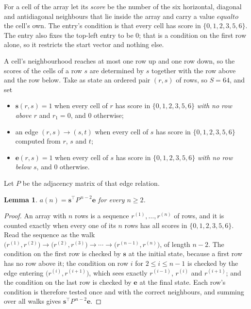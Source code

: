 \documentclass[11pt,a4paper]{article}
\theoremstyle{plain}
\newtheorem{lemma}[theorem]{Lemma}
\theoremstyle{definition}
\begin{document}
For a cell of the array let its \emph{score} be the number of the six horizontal, diagonal and antidiagonal neighbours that lie inside
the array and carry a value $equal to$ the cell's own. The entry's condition is that every cell
has score in $\{0,1,2,3,5,6\}$. The entry also fixes the top-left entry to be $0$; that is a condition on the first row alone, so it restricts the start vector and nothing else.

A cell's neighbourhood reaches at most one row up and one row down, so the scores of the
cells of a row $s$ are determined by $s$ together with the row above and the row below.
Take as state an ordered pair $(r,s)$ of rows, so $S=64$, and set
\begin{itemize}
\item $\mathbf{s}(r,s)=1$ when every cell of $r$ has score in $\{0,1,2,3,5,6\}$ \emph{with no row
above $r$} and $r_1=0$, and $0$ otherwise;
\item an edge $(r,s)\to(s,t)$ when every cell of $s$ has score in $\{0,1,2,3,5,6\}$ computed from
$r$, $s$ and $t$;
\item $\mathbf{e}(r,s)=1$ when every cell of $s$ has score in $\{0,1,2,3,5,6\}$ \emph{with no row
below $s$}, and $0$ otherwise.
\end{itemize}
Let $P$ be the adjacency matrix of that edge relation.

\begin{lemma}\label{lem:walk}
$a(n)=\mathbf{s}^{\!\top}P^{\,n-2}\mathbf{e}$ for every $n\ge2$.
\end{lemma}

\begin{proof}
An array with $n$ rows is a sequence $r^{(1)},\dots,r^{(n)}$ of rows, and it is counted
exactly when every one of its $n$ rows has all scores in $\{0,1,2,3,5,6\}$. Read the sequence as the
walk $\bigl(r^{(1)},r^{(2)}\bigr)\to\bigl(r^{(2)},r^{(3)}\bigr)\to\cdots\to
\bigl(r^{(n-1)},r^{(n)}\bigr)$, of length $n-2$. The condition on the first row is
checked by $\mathbf{s}$ at the initial state, because a first row has no row above it; the
condition on row $i$ for $2\le i\le n-1$ is checked by the edge entering
$\bigl(r^{(i)},r^{(i+1)}\bigr)$, which sees exactly $r^{(i-1)}$, $r^{(i)}$ and
$r^{(i+1)}$; and the condition on the last row is checked by $\mathbf{e}$ at the final
state. Each row's condition is therefore tested once and with the correct neighbours, and
summing over all walks gives $\mathbf{s}^{\!\top}P^{\,n-2}\mathbf{e}$.
\end{proof}
\end{document}
